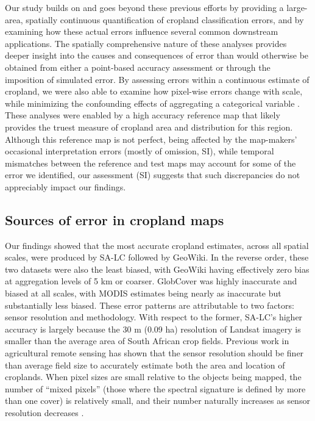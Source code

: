 \documentclass[a4paper]{article}
\begin{document}
Our study builds on and goes beyond these previous efforts by providing a large-area, spatially continuous quantification of cropland classification errors, and by examining how these actual errors influence several common downstream applications. The spatially comprehensive nature of these analyses provides deeper insight into the causes and consequences of error than would otherwise be obtained from either a point-based accuracy assessment or through the imposition of simulated error. By assessing errors within a continuous estimate of cropland, we were also able to examine how pixel-wise errors change with scale, while minimizing the confounding effects of aggregating a categorical variable \citep[][and see discussion in subsequent Recommendations section]{moody_influence_1995, marceau_remote_1999}. These analyses were enabled by a high accuracy reference map that likely provides the truest measure of cropland area and distribution for this region. Although this reference map is not perfect, being affected by the map-makers' occasional interpretation errors (mostly of omission, SI), while temporal mismatches between the reference and test maps may account for some of the error we identified, our assessment (SI) suggests that such discrepancies do not appreciably impact our findings. 

\vspace{-0.3 cm} 
\subsection*{Sources of error in cropland maps}
\vspace{-0.2 cm}
Our findings showed that the most accurate cropland estimates, across all spatial scales, were produced by SA-LC followed by GeoWiki. In the reverse order, these two datasets were also the least biased, with GeoWiki having effectively zero bias at aggregation levels of 5 km or coarser.  GlobCover was highly inaccurate and biased at all scales, with MODIS estimates being nearly as inaccurate but substantially less biased. These error patterns are attributable to two factors: sensor resolution and methodology. With respect to the former, SA-LC's higher accuracy is largely because the 30 m (0.09 ha) resolution of Landsat imagery is smaller than the average area of South African crop fields. Previous work in agricultural remote sensing has shown that the sensor resolution should be finer than average field size to accurately estimate both the area and location of croplands\citep{ozdogan_resolution_2006,pax-lenney_effect_1997}. When pixel sizes are small relative to the objects being mapped, the number of ``mixed pixels'' (those where the spectral signature is defined by more than one cover) is relatively small, and their number naturally increases as sensor resolution decreases \citep{ozdogan_resolution_2006}. 
\end{document}
